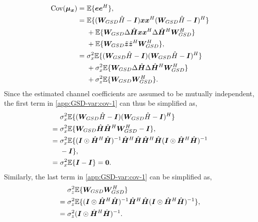 \documentclass[journal]{IEEEtran}
\begin{document}
\begin{equation}
\begin{split}
\text{Cov}(\bm {\mu}_{\bm x}) = \hspace{0.3em} & \mathbb{E}\{\bm e \bm e^H\}, \\
=\hspace{0.3em} & \mathbb{E}\{({\bm W}_{GSD}\hat{H} - \bm I)\bm x \bm x^H ({\bm W}_{GSD}\hat{H} - \bm I)^H\} \\
& + \mathbb{E}\{ {\bm W}_{GSD}\Delta \hat{\bm H} \bm x \bm x^H \Delta \hat{\bm H}^H{\bm W}_{GSD}^H\} \\ 
& + \mathbb{E}\{ {\bm W}_{GSD}\tilde{\bm z}\tilde{\bm z}^H{\bm W}_{GSD}^H \}, \\
=\hspace{0.3em} & \sigma_x^2\mathbb{E}\{({\bm W}_{GSD}\hat{H} - \bm I)({\bm W}_{GSD}\hat{H} - \bm I)^H\} \\
& + \sigma_x^2\mathbb{E}\{{\bm W}_{GSD} \Delta \hat{\bm H} \Delta \hat{\bm H}^H{\bm W}_{GSD}^H\} \\ 
& + \sigma_z^2\mathbb{E}\{ {\bm W}_{GSD}{\bm W}_{GSD}^H \}. \\
\end{split}
\label{app:GSD-var:cov-1}
\end{equation}
Since the estimated channel coefficients are assumed to be mutually independent, the first term in \eqref{app:GSD-var:cov-1} can thus be simplified as,
\begin{equation}
\begin{split}
& \sigma_x^2\mathbb{E}\{({\boldsymbol{W}}_{GSD}\hat{H} - \boldsymbol{I})({\boldsymbol{W}}_{GSD}\hat{H} - \boldsymbol{I})^H\}\\
=\hspace{0.3em} & \sigma_x^2\mathbb{E}\{{\boldsymbol{W}}_{GSD}\hat{\boldsymbol{H}}\hat{\boldsymbol{H}}^H{\boldsymbol{W}}_{GSD}^H - \boldsymbol{I}\}, \\
=\hspace{0.3em} & \sigma_x^2\mathbb{E}\{ (\boldsymbol{I}\odot\hat{\boldsymbol{H}}^H \hat{\boldsymbol{H}})^{-1}\hat{\boldsymbol{H}}^H \hat{\boldsymbol{H}}\hat{\boldsymbol{H}}^H \hat{\boldsymbol{H}} (\boldsymbol{I}\odot\hat{\boldsymbol{H}}^H \hat{\boldsymbol{H}})^{-1} \\
& - \boldsymbol{I}\}, \\
=\hspace{0.3em} & \sigma_x^2\mathbb{E}\{ \boldsymbol{I} - \boldsymbol{I}\} = \boldsymbol{0}.
\end{split}
\end{equation}
Similarly, the last term in \eqref{app:GSD-var:cov-1} can be simplified as,
\begin{equation}
\begin{split}
 \hspace{0.3em}&\sigma_z^2\mathbb{E}\{ {\boldsymbol{W}}_{GSD}{\boldsymbol{W}}_{GSD}^H \} \\
=\hspace{0.3em} & \sigma_z^2\mathbb{E}\{(\boldsymbol{I}\odot\hat{\boldsymbol{H}}^H \hat{\boldsymbol{H}})^{-1}\hat{\boldsymbol{H}}^H \hat{\boldsymbol{H}} (\boldsymbol{I}\odot\hat{\boldsymbol{H}}^H \hat{\boldsymbol{H}})^{-1} \}, \\
=\hspace{0.3em} & \sigma_z^2(\boldsymbol{I}\odot \hat{\boldsymbol{H}}^H \hat{\boldsymbol{H}})^{-1}.
\end{split}
\end{equation}
\end{document}
